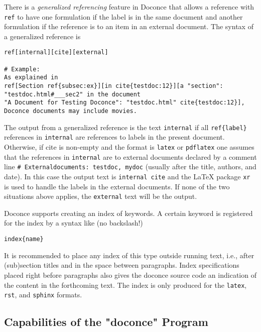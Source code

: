\documentclass[twoside]{article}
\begin{document}
There is a \emph{generalized referencing} feature in Doconce that allows
a reference with {\fontsize{10pt}{10pt}\verb!ref!} to have one formulation if the label is
in the same document and another formulation if the reference is
to an item in an external document. The syntax of a generalized
reference is
\begin{Verbatim}
ref[internal][cite][external]

# Example:
As explained in
ref[Section ref{subsec:ex}][in cite{testdoc:12}][a "section":
"testdoc.html#___sec2" in the document
"A Document for Testing Doconce": "testdoc.html" cite{testdoc:12}],
Doconce documents may include movies.
\end{Verbatim}
The output from a generalized reference is the text {\fontsize{10pt}{10pt}\verb!internal!} if all
{\fontsize{10pt}{10pt}\verb!ref{label}!} references in {\fontsize{10pt}{10pt}\verb!internal!} are references to labels in the
present document. Otherwise, if cite is non-empty and the format is
{\fontsize{10pt}{10pt}\verb!latex!} or {\fontsize{10pt}{10pt}\verb!pdflatex!} one assumes that the references in {\fontsize{10pt}{10pt}\verb!internal!}
are to external documents declared by a comment line {\fontsize{10pt}{10pt}\verb!# Externaldocuments: testdoc, mydoc!} (usually after the title, authors,
and date). In this case the output text is {\fontsize{10pt}{10pt}\verb!internal cite!} and the
{\LaTeX} package {\fontsize{10pt}{10pt}\verb!xr!} is used to handle the labels in the external
documents.  If none of the two situations above applies, the
{\fontsize{10pt}{10pt}\verb!external!} text will be the output.

Doconce supports creating an index of keywords. A certain keyword
is registered for the index by a syntax like (no
backslash!)
\begin{Verbatim}
index{name}
\end{Verbatim}
It is recommended to place any index of this type outside
running text, i.e., after (sub)section titles and in the space between
paragraphs. Index specifications placed right before paragraphs also
gives the doconce source code an indication of the content in the
forthcoming text. The index is only produced for the {\fontsize{10pt}{10pt}\verb!latex!}, {\fontsize{10pt}{10pt}\verb!rst!}, and
{\fontsize{10pt}{10pt}\verb!sphinx!} formats.

\subsection{Capabilities of the "doconce" Program}
\end{document}
